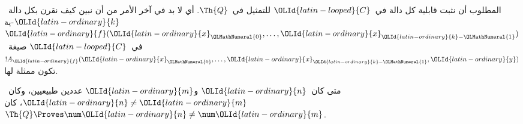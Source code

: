 \documentclass[../../../include/open-logic-section]{subfiles}
\begin{document}

المطلوب أن نثبت قابلية كل دالة في~$\OLId{latin-looped}{C}$ للتمثيل في~$\Th{Q}$. أي لا بد في
آخر الأمر من أن نبين كيف نقرن بكل دالة~$\OLId{latin-ordinary}{k}$-ية
$\OLId{latin-ordinary}{f}(\OLId{latin-ordinary}{x}_\OLMathNumeral{0},\dots,\OLId{latin-ordinary}{x}_{\OLId{latin-ordinary}{k}-\OLMathNumeral{1}})$ في~$\OLId{latin-looped}{C}$ صيغة~$!A_\OLId{latin-ordinary}{f}(\OLId{latin-ordinary}{x}_\OLMathNumeral{0},\dots,\OLId{latin-ordinary}{x}_{\OLId{latin-ordinary}{k}-\OLMathNumeral{1}},\OLId{latin-ordinary}{y})$ تكون
ممثلة لها.

\begin{lem}
متى كان~$\OLId{latin-ordinary}{n}$ و$\OLId{latin-ordinary}{m}$ عددين طبيعيين، وكان~$\OLId{latin-ordinary}{n} \neq \OLId{latin-ordinary}{m}$، كان
$\Th{Q} \Proves \num \OLId{latin-ordinary}{n} \neq \num \OLId{latin-ordinary}{m}$.
\end{lem}
\end{document}
